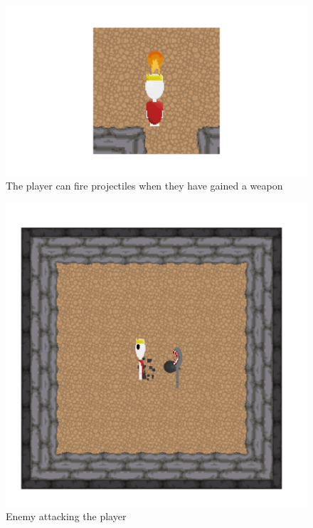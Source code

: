 \documentclass[../Main.tex]{subfiles}
\begin{document}
            \begin{figure}[hbt!]
                \centerline{\includegraphics[scale=0.7]{img/Testing/Objective/Firing.png}}
                \caption{The player can fire projectiles when they have gained a weapon}
                \label{fig:Firing}
            \end{figure}
            \begin{figure}[hbt!]
                \centerline{\includegraphics[scale=0.6]{img/Testing/Objective/Enemy.png}}
                \caption{Enemy attacking the player}
                \label{fig:Enemy}
            \end{figure}
\end{document}
